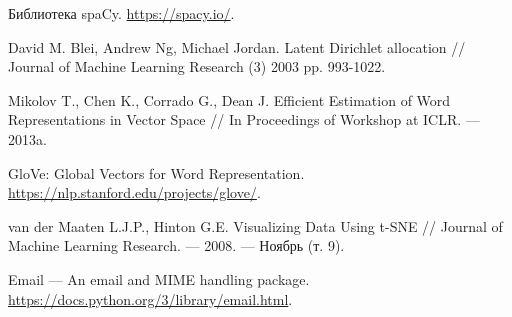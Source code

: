 \begin{thebibliography}{3}
Библиотека spaCy. \url{https://spacy.io/}.

David M. Blei, Andrew Ng, Michael Jordan. Latent Dirichlet allocation // Journal of Machine Learning Research (3) 2003 pp. 993-1022.

Mikolov T., Chen K., Corrado G., Dean J. Efficient Estimation of Word Representations in Vector Space // In Proceedings of Workshop at ICLR. — 2013a.

GloVe: Global Vectors for Word Representation. \url{https://nlp.stanford.edu/projects/glove/}.

van der Maaten L.J.P., Hinton G.E. Visualizing Data Using t-SNE // Journal of Machine Learning Research. — 2008. — Ноябрь (т. 9).

Email — An email and MIME handling package. \url{https://docs.python.org/3/library/email.html}.

\end{thebibliography}


